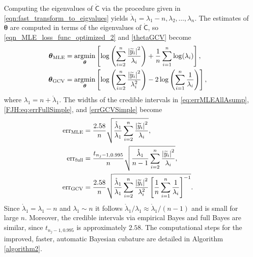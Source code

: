 \documentclass[twocolumn]{svjour3}          %
\newcommand{\bm}[1]{\boldsymbol{#1}}
\newcommand{\rlambda}{\mathring{\lambda}}
\newcommand{\vtheta}{{\bm{\theta}}}
\newcommand{\rmC}{\mathring{\mathsf{C}}}
\newcommand{\MLE}{\textup{MLE}}
\newcommand{\GCV}{\textup{GCV}}
\newcommand{\err}{\textup{err}}
\def\abs#1{\ensuremath{\left \lvert #1 \right \rvert}}
\providecommand{\argmin}{\operatorname*{argmin}}
\begin{document}
Computing the eigenvalues of $\rmC$ via the procedure given in \eqref{eqn:fast_transform_to_eigvalues} yields $\rlambda_1 = \lambda_1 - n, \lambda_2, \ldots, \lambda_n$. The estimates of $\vtheta$ are computed in terms of the eigenvalues of $\rmC$, so \eqref{eqn_MLE_loss_func_optimized_2} and \eqref{thetaGCV} become
\begin{subequations}
\label{thetaSimple}
\begin{align}
\label{thetaSimpleMLE}
\vtheta_\MLE
&= 
\argmin_{\vtheta}
\left[
\log\left(
\sum_{i=2}^n \frac{\abs{\widetilde{y}_i}^2}{\lambda_i}
\right) 
 + 
 \frac{1}{n}\sum_{i=1}^n \log(\lambda_i)
\right], \\
\label{thetaSimpleGCV}
\vtheta_{\GCV} 
&= \argmin_\vtheta \left[ \log \left ( \sum_{i=2}^n \frac{\abs{\widetilde{y}_i}^2}{\lambda_i^2} 
\right)  -2\log\left( \sum_{i=1}^n \frac{1}{\lambda_i} \right)
\right],
\end{align}
\end{subequations}
where $\lambda_1 = n + \rlambda_1$.  The widths of the credible intervals in \eqref{eq:errMLEAllAsump}, \eqref{FJH:eq:errFullSimple}, and   \eqref{errGCVSimple} become
\begin{subequations}
\label{fastStoppingCriterions}
	\begin{align}
\label{fastStoppingCriterionMLE}
\err_\MLE  &
=
\frac{2.58}{n}\sqrt{
	\frac{\rlambda_1}{\lambda_1}
	\sum_{i=2}^{n} \frac{\abs{\widetilde{y}_i}^2}{\lambda_i}  
}, 
\\
\label{fastStoppingCriterionFull}
\err_{\textup{full}} 
& = \frac{t_{n_j-1,0.995}}{n} \sqrt{
	\frac{\rlambda_1}{n-1} \sum_{i=2}^n \frac{\abs{\widetilde{y}_i}^2}{\lambda_i}
}, \\
\label{fastStoppingCriterionGCV}
\err_{\textup{GCV}} & =
\frac{2.58}{n}\sqrt{	\frac{\rlambda_1}{\lambda_1} \sum_{i=2}^n \frac{\abs{\widetilde{y}_i}^2}{\lambda_i^2}  \left [ \frac 1n \sum_{i=1}^n \frac{1}{\lambda_i} \right]^{-1}} .
	\end{align}
\end{subequations}
Since $\rlambda_1 = \lambda_1 - n$ and $\lambda_1 \sim n$ it follows $\rlambda_1/\lambda_1 \approx \rlambda_1/(n-1)$ and is small for  large $n$.  Moreover, the credible intervals via empirical Bayes and full Bayes are similar, since $t_{n_j-1,0.995}$ is approximately $2.58$. 
The computational steps for the improved, faster, automatic Bayesian cubature are detailed in Algorithm \ref{algorithm2}.
\end{document}
